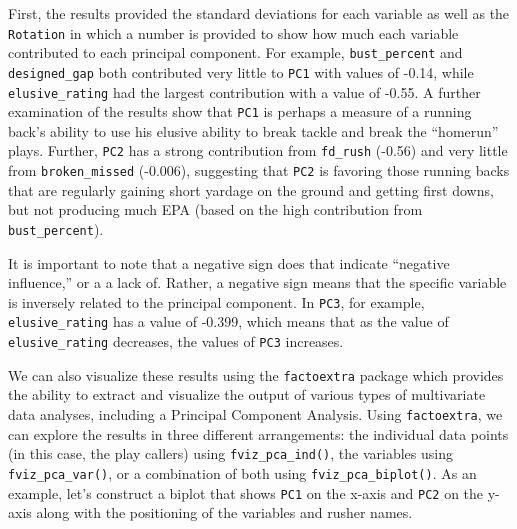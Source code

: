 \documentclass[
  letterpaper,
]{krantz}
\begin{document}
First, the results provided the standard deviations for each variable as
well as the \texttt{Rotation} in which a number is provided to show how
much each variable contributed to each principal component. For example,
\texttt{bust\_percent} and \texttt{designed\_gap} both contributed very
little to \texttt{PC1} with values of -0.14, while
\texttt{elusive\_rating} had the largest contribution with a value of
-0.55. A further examination of the results show that \texttt{PC1} is
perhaps a measure of a running back's ability to use his elusive ability
to break tackle and break the ``homerun'' plays. Further, \texttt{PC2}
has a strong contribution from \texttt{fd\_rush} (-0.56) and very little
from \texttt{broken\_missed} (-0.006), suggesting that \texttt{PC2} is
favoring those running backs that are regularly gaining short yardage on
the ground and getting first downs, but not producing much EPA (based on
the high contribution from \texttt{bust\_percent}).

\begin{tcolorbox}[enhanced jigsaw, left=2mm, toprule=.15mm, opacitybacktitle=0.6, leftrule=.75mm, bottomrule=.15mm, colbacktitle=quarto-callout-note-color!10!white, breakable, colback=white, bottomtitle=1mm, toptitle=1mm, title=\textcolor{quarto-callout-note-color}{\faInfo}\hspace{0.5em}{Note}, coltitle=black, titlerule=0mm, arc=.35mm, opacityback=0, colframe=quarto-callout-note-color-frame, rightrule=.15mm]

It is important to note that a negative sign does that indicate
``negative influence,'' or a a lack of. Rather, a negative sign means
that the specific variable is inversely related to the principal
component. In \texttt{PC3}, for example, \texttt{elusive\_rating} has a
value of -0.399, which means that as the value of
\texttt{elusive\_rating} decreases, the values of \texttt{PC3}
increases.

\end{tcolorbox}

We can also visualize these results using the \texttt{factoextra}
package which provides the ability to extract and visualize the output
of various types of multivariate data analyses, including a Principal
Component Analysis. Using \texttt{factoextra}, we can explore the
results in three different arrangements: the individual data points (in
this case, the play callers) using \texttt{fviz\_pca\_ind()}, the
variables using \texttt{fviz\_pca\_var()}, or a combination of both
using \texttt{fviz\_pca\_biplot()}. As an example, let's construct a
biplot that shows \texttt{PC1} on the x-axis and \texttt{PC2} on the
y-axis along with the positioning of the variables and rusher names.
\end{document}
